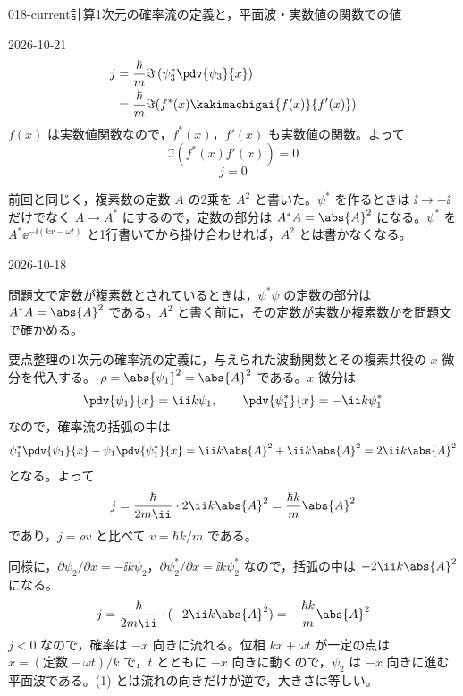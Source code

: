 \documentclass[uplatex,dvipdfmx,a4paper,11pt]{jsarticle}
\begin{document}
\begin{mondai}{018-current}{計算}{1次元の確率流の定義と，平面波・実数値の関数での値}
\begin{kotaeutsushi}{2026-10-21}
\begin{align*}
j&=\frac{\hbar}{m}\Im\left(\psi_{3}^{*}\pdv{\psi_{3}}{x}\right)\\
&=\frac{\hbar}{m}\Im(f^{*}(x)\kakimachigai{f(x)}{f'(x)})
\end{align*}
$f(x)$ は実数値関数なので，$f^{*}(x)$，$f'(x)$ も実数値の関数。よって
\[ \Im(f^{*}(x)f'(x))=0 \]
\[ j=0 \]
\end{kotaeutsushi}
\begin{kizuki}
\item {} 前回と同じく，複素数の定数 $A$ の2乗を $A^{2}$ と書いた。$\psi^{*}$ を作るときは $\ii\to-\ii$ だけでなく $A\to A^{*}$ にするので，定数の部分は $A^{*}A=\abs{A}^{2}$ になる。$\psi^{*}$ を $A^{*}\ee^{-\ii(kx-\omega t)}$ と1行書いてから掛け合わせれば，$A^{2}$ とは書かなくなる。
\end{kizuki}
\begin{maekizuki}{2026-10-18}
\item 問題文で定数が複素数とされているときは，$\psi^{*}\psi$ の定数の部分は $A^{*}A=\abs{A}^{2}$ である。$A^{2}$ と書く前に，その定数が実数か複素数かを問題文で確かめる。
\end{maekizuki}
\begin{tadashii}
\houshin 要点整理の1次元の確率流の定義に，与えられた波動関数とその複素共役の $x$ 微分を代入する。
\keisan {} $\rho=\abs{\psi_{1}}^{2}=\abs{A}^{2}$ である。$x$ 微分は
\[
  \pdv{\psi_{1}}{x}=\ii k\psi_{1},\qquad\pdv{\psi_{1}^{*}}{x}=-\ii k\psi_{1}^{*}
\]
なので，確率流の括弧の中は
\[
  \psi_{1}^{*}\pdv{\psi_{1}}{x}-\psi_{1}\pdv{\psi_{1}^{*}}{x}=\ii k\abs{A}^{2}+\ii k\abs{A}^{2}=2\ii k\abs{A}^{2}
\]
となる。よって
\[
  j=\frac{\hbar}{2m\ii}\cdot2\ii k\abs{A}^{2}=\frac{\hbar k}{m}\abs{A}^{2}
\]
であり，$j=\rho v$ と比べて $v=\hbar k/m$ である。

 同様に，$\partial\psi_{2}/\partial x=-\ii k\psi_{2}$，$\partial\psi_{2}^{*}/\partial x=\ii k\psi_{2}^{*}$ なので，括弧の中は $-2\ii k\abs{A}^{2}$ になる。
\[
  j=\frac{\hbar}{2m\ii}\cdot(-2\ii k\abs{A}^{2})=-\frac{\hbar k}{m}\abs{A}^{2}
\]
$j<0$ なので，確率は $-x$ 向きに流れる。位相 $kx+\omega t$ が一定の点は $x=(\text{定数}-\omega t)/k$ で，$t$ とともに $-x$ 向きに動くので，$\psi_{2}$ は $-x$ 向きに進む平面波である。(1) とは流れの向きだけが逆で，大きさは等しい。


\end{tadashii}
\end{mondai}
\end{document}
